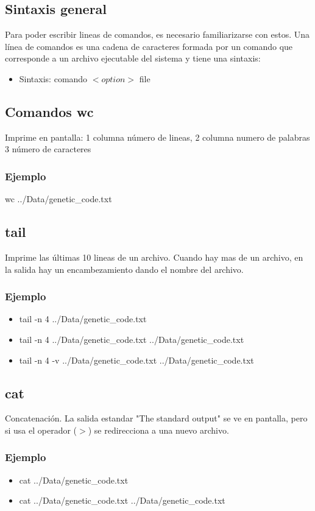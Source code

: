 \documentclass[10pt]{article}
\begin{document}
\subsection{Sintaxis general}
Para poder escribir lineas de comandos, es necesario familiarizarse con estos. Una línea de comandos es una cadena de caracteres formada por un comando que corresponde a un archivo ejecutable del sistema y tiene una sintaxis:

\begin{itemize}
\item  Sintaxis: comando $<option>$ file
\end{itemize}


\subsection {Comandos wc}
Imprime en pantalla: 1 columna número de lineas, 2 columna numero de palabras 3 número de caracteres
\subsubsection{Ejemplo}
wc ../Data/genetic\_code.txt

\subsection{tail}
Imprime las últimas 10 lineas de un archivo. Cuando hay mas de un archivo, en la salida hay un encambezamiento  dando el nombre del archivo.
\subsubsection{Ejemplo}

\begin{itemize}
\item tail -n 4 ../Data/genetic\_code.txt
\item tail -n 4 ../Data/genetic\_code.txt ../Data/genetic\_code.txt
\item tail -n 4 -v  ../Data/genetic\_code.txt ../Data/genetic\_code.txt
\end{itemize}


\subsection{cat}
Concatenación. La salida estandar "The standard output" se ve en pantalla, pero si usa el operador ($>$) se redirecciona a una nuevo archivo.
\subsubsection{Ejemplo}
\begin{itemize}
\item cat ../Data/genetic\_code.txt
\item cat ../Data/genetic\_code.txt ../Data/genetic\_code.txt
\end{itemize}
\end{document}
